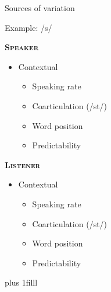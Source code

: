 \documentclass{beamer}
\newcommand{\btVFill}{\vskip0pt plus 1filll}
\begin{document}
\begin{frame}{Sources of variation}

Example: /s/

\begin{minipage}[t]{0.45\textwidth}
\textbf{\textsc{Speaker}}

\begin{itemize}
\item Contextual
\begin{itemize}
\item Speaking rate
\item Coarticulation (/st\textturnr/)
\item Word position
\item Predictability
\end{itemize}

\end{itemize}
\end{minipage}
\hfill
\begin{minipage}[t]{0.45\textwidth}
\textbf{\textsc{Listener}}

\begin{itemize}
\item Contextual
\begin{itemize}
\item Speaking rate
\item Coarticulation (/st\textturnr/)
\item Word position
\item Predictability
\end{itemize}
\end{itemize}
\end{minipage}
\btVFill
\begin{flushright}
\scriptsize
\citet{Lieberman1963,Kraljic2008a,Clopper2008, Pitt2012}
\end{flushright}
\end{frame}
\end{document}
